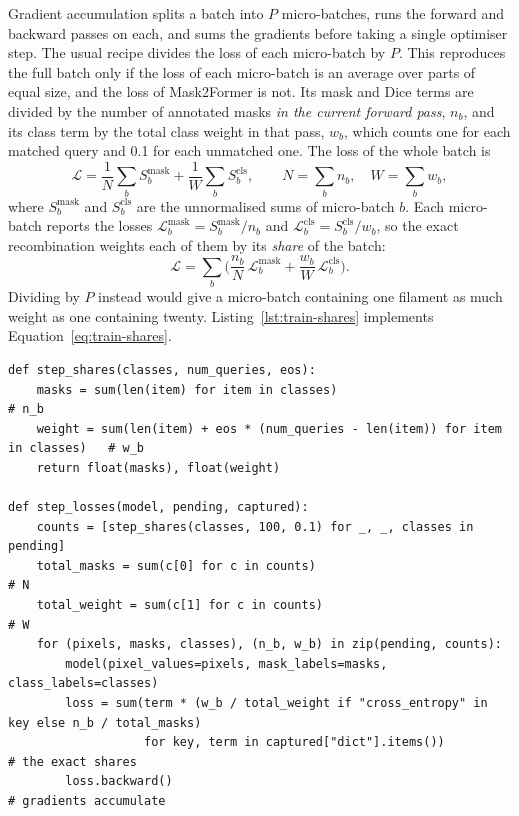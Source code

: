 Gradient accumulation splits a batch into $P$ micro-batches, runs the forward and backward passes on
each, and sums the gradients before taking a single optimiser step. The usual recipe divides the loss of
each micro-batch by $P$. This reproduces the full batch only if the loss of each micro-batch is an
average over parts of equal size, and the loss of Mask2Former is not. Its mask and Dice terms are
divided by the number of annotated masks \emph{in the current forward pass}, $n_b$, and its class term
by the total class weight in that pass, $w_b$, which counts one for each matched query and 0.1 for
each unmatched one. The loss of the whole batch is
\begin{equation}
\mathcal{L} = \frac{1}{N}\sum_b S^{\text{mask}}_b + \frac{1}{W}\sum_b S^{\text{cls}}_b,
\qquad N = \sum_b n_b,\quad W = \sum_b w_b,
\end{equation}
where $S^{\text{mask}}_b$ and $S^{\text{cls}}_b$ are the unnormalised sums of micro-batch $b$. Each
micro-batch reports the losses $\mathcal{L}^{\text{mask}}_b = S^{\text{mask}}_b/n_b$ and
$\mathcal{L}^{\text{cls}}_b = S^{\text{cls}}_b/w_b$, so the exact recombination weights each of them by
its \emph{share} of the batch:
\begin{equation}
\mathcal{L} = \sum_b \Big(\frac{n_b}{N}\,\mathcal{L}^{\text{mask}}_b + \frac{w_b}{W}\,\mathcal{L}^{\text{cls}}_b\Big).
\label{eq:train-shares}
\end{equation}
Dividing by $P$ instead would give a micro-batch containing one filament as much weight as one
containing twenty. Listing~\ref{lst:train-shares} implements Equation~\eqref{eq:train-shares}.

\begin{lstlisting}[caption={Scaling each micro-batch by its exact share. Condensed from
\file{experiments/exp\_139\_mask2former/src/train.py}.},label=lst:train-shares]
def step_shares(classes, num_queries, eos):
    masks = sum(len(item) for item in classes)                          # n_b
    weight = sum(len(item) + eos * (num_queries - len(item)) for item in classes)   # w_b
    return float(masks), float(weight)

def step_losses(model, pending, captured):
    counts = [step_shares(classes, 100, 0.1) for _, _, classes in pending]
    total_masks = sum(c[0] for c in counts)                            # N
    total_weight = sum(c[1] for c in counts)                           # W
    for (pixels, masks, classes), (n_b, w_b) in zip(pending, counts):
        model(pixel_values=pixels, mask_labels=masks, class_labels=classes)
        loss = sum(term * (w_b / total_weight if "cross_entropy" in key else n_b / total_masks)
                   for key, term in captured["dict"].items())          # the exact shares
        loss.backward()                                                # gradients accumulate
\end{lstlisting}

